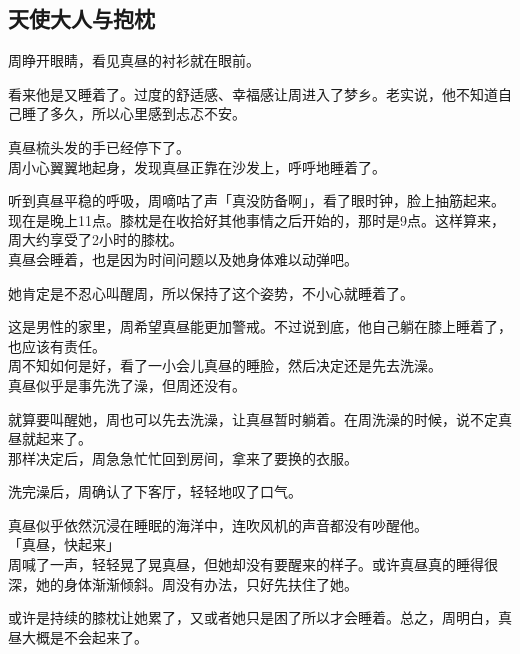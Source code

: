 \subsection{天使大人与抱枕}

周睁开眼睛，看见真昼的衬衫就在眼前。

看来他是又睡着了。过度的舒适感、幸福感让周进入了梦乡。老实说，他不知道自己睡了多久，所以心里感到忐忑不安。

真昼梳头发的手已经停下了。\\

周小心翼翼地起身，发现真昼正靠在沙发上，呼呼地睡着了。

听到真昼平稳的呼吸，周嘀咕了声「真没防备啊」，看了眼时钟，脸上抽筋起来。\\

现在是晚上11点。膝枕是在收拾好其他事情之后开始的，那时是9点。这样算来，周大约享受了2小时的膝枕。\\

真昼会睡着，也是因为时间问题以及她身体难以动弹吧。

她肯定是不忍心叫醒周，所以保持了这个姿势，不小心就睡着了。

这是男性的家里，周希望真昼能更加警戒。不过说到底，他自己躺在膝上睡着了，也应该有责任。\\

周不知如何是好，看了一小会儿真昼的睡脸，然后决定还是先去洗澡。\\

真昼似乎是事先洗了澡，但周还没有。

就算要叫醒她，周也可以先去洗澡，让真昼暂时躺着。在周洗澡的时候，说不定真昼就起来了。\\

那样决定后，周急急忙忙回到房间，拿来了要换的衣服。\\

\vspace{2\baselineskip}

洗完澡后，周确认了下客厅，轻轻地叹了口气。

真昼似乎依然沉浸在睡眠的海洋中，连吹风机的声音都没有吵醒他。\\

「真昼，快起来」\\

周喊了一声，轻轻晃了晃真昼，但她却没有要醒来的样子。或许真昼真的睡得很深，她的身体渐渐倾斜。周没有办法，只好先扶住了她。

或许是持续的膝枕让她累了，又或者她只是困了所以才会睡着。总之，周明白，真昼大概是不会起来了。\\

